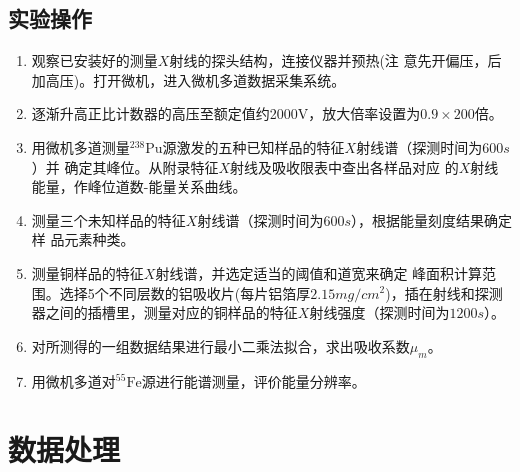 \documentclass{article}
\begin{document}
    \subsection{实验操作}
    \begin{enumerate}
        \item 观察已安装好的测量$X$射线的探头结构，连接仪器并预热(注
        意先开偏压，后加高压)。打开微机，进入微机多道数据采集系统。
        \item 逐渐升高正比计数器的高压至额定值约2000V，放大倍率设置为$0.9 \times 200 $倍。
        \item 用微机多道测量$^{238}\text{Pu}$源激发的五种已知样品的特征$X$射线谱（探测时间为$600\si{s}$）并
        确定其峰位。从附录特征$X$射线及吸收限表中查出各样品对应
        的$X$射线能量，作峰位道数-能量关系曲线。 
        \item 测量三个未知样品的特征$X$射线谱（探测时间为$600\si{s}$），根据能量刻度结果确定样
        品元素种类。
        \item 测量铜样品的特征$X$射线谱，并选定适当的阈值和道宽来确定
        峰面积计算范围。选择5个不同层数的铝吸收片(每片铝箔厚$2.15\si{mg\per cm^2}$)，插在射线和探测器之间的插槽里，测量对应的铜样品的特征$X$射线强度（探测时间为$1200\si{s}$）。
        \item 对所测得的一组数据结果进行最小二乘法拟合，求出吸收系数$\mu_m$。
        \item 用微机多道对$^{55}\text{Fe}$源进行能谱测量，评价能量分辨率。
    \end{enumerate}
    \section{数据处理}
\end{document}

